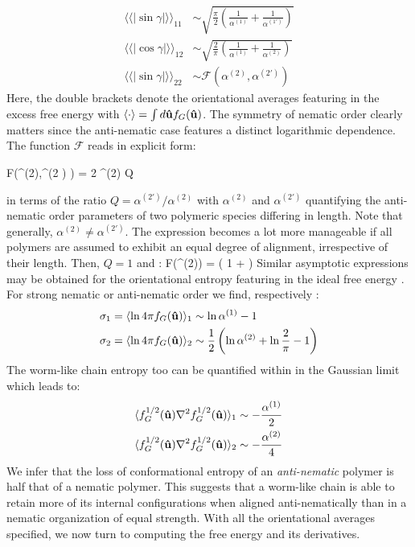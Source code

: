 \begin{align}
\langle \langle | \sin \gamma | \rangle \rangle_{11} & \sim \sqrt{ \frac{\pi}{2} \left ( \frac{1}{\alpha^{(1)}} + \frac{1}{\alpha^{(1\prime)}} \right ) } \nonumber \\  
    \langle \langle | \cos \gamma | \rangle \rangle_{12} & \sim  \sqrt{ \frac{2}{\pi} \left ( \frac{1}{\alpha^{(1)}} + \frac{1}{\alpha^{(2)}} \right ) } \nonumber \\ 
    \langle \langle | \sin \gamma | \rangle \rangle_{22} & \sim \mathcal{F} (\alpha^{(2)}, \alpha^{(2\prime)})
    \label{sinav}
\end{align}
Here,  the double brackets denote the orientational averages featuring in the excess free energy  with $ \langle \cdot \rangle = \int d {\bf \hat{u}} f_{G} ({\bf \hat{u}}) $. The symmetry of nematic order clearly matters since the anti-nematic case features a distinct logarithmic dependence. The function ${\mathcal F}$ reads in explicit form:

\beq
 {\mathcal F}(\alpha^{(2)},\alpha^{(2 \prime)} ) =  {2 \pi \alpha^{(2)} Q}
\eeq

in terms of the ratio $Q=  \alpha^{(2\prime)}/ \alpha^{(2)}$ with $\alpha^{(2)}$ and $\alpha^{(2\prime)}$ quantifying the anti-nematic order parameters of two polymeric species differing in length. Note that generally, $\alpha^{(2)} \neq \alpha^{(2\prime)}$. The expression becomes a lot more manageable if all polymers are assumed to exhibit an equal degree of alignment, irrespective of their length. Then, $Q=1$ and \cite{wensink2001}:
\beq
{\mathcal F}(\alpha^{(2)})  =   \left ( 1 +  \right )
\eeq
Similar asymptotic expressions may be obtained for the orientational entropy featuring in the ideal free energy . For strong nematic or anti-nematic order we find, respectively \cite{wensinkrodplate}:
\begin{align}
\sigma_{1} = \langle \ln 4 \pi f_{G} ({\bf \hat{u}}) \rangle_{1} &\sim \ln \alpha^{(1)} -1  \nonumber \\
\sigma_{2} =\langle \ln 4 \pi f_{G} ({\bf \hat{u}}) \rangle_{2}   &\sim \frac{1}{2} \left ( \ln \alpha^{(2)} + \ln \frac{2}{\pi} -1 \right )  
\label{sigma12}
\end{align}
The worm-like chain entropy  too can be quantified within in the Gaussian limit which leads to:
\begin{align}
\langle  f_{G}^{1/2} ({\bf \hat{u}}) \nabla^{2} f_{G}^{1/2} ({\bf \hat{u}})  \rangle_{1} & \sim -\frac{\alpha^{(1)}}{2} \nonumber \\ 
\langle  f_{G}^{1/2} ({\bf \hat{u}}) \nabla^{2}  f_{G}^{1/2} ({\bf \hat{u}})  \rangle_{2} & \sim  
-\frac{\alpha^{(2)}}{4} 
\end{align}
We infer that the loss of conformational entropy of an {\em anti-nematic} polymer is half that of a nematic polymer. This suggests that a worm-like chain is able to retain more of its internal configurations when aligned anti-nematically than in a nematic organization of equal strength. With all the orientational averages specified, we  now turn to computing the free energy and its derivatives. 



